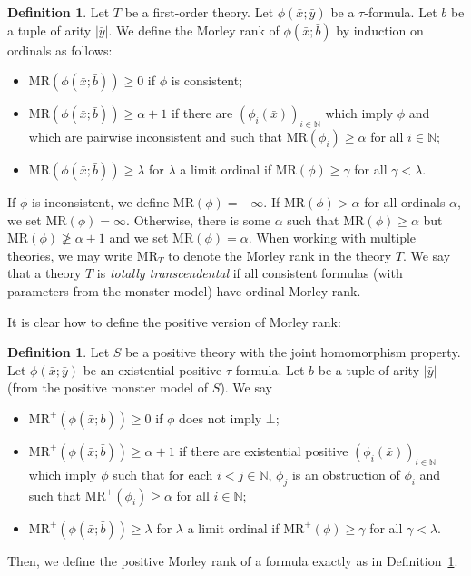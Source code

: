 \documentclass{amsart}
\theoremstyle{definition}
\newtheorem{definition}[theorem]{Definition}
\theoremstyle{remark}
\numberwithin{equation}{section}
\newcommand{\RM}{\mathrm{MR}}
\begin{document}
\begin{definition}\label{def:MR} Let $T$ be a first-order theory. Let $\phi(\bar{x};\bar{y})$ be a $\tau$-formula. Let $b$ be a tuple of arity $|\bar{y}|$. We define the Morley rank of $\phi(\bar{x};\bar{b})$ by induction on ordinals as follows: 
\begin{itemize}
    \item $\RM(\phi(\bar{x};\bar{b}))\geq 0$ if $\phi$ is consistent;
    \item $\RM(\phi(\bar{x};\bar{b}))\geq{\alpha}+1$ if there are $(\phi_i(\bar{x}))_{i\in\mathbb{N}}$ which imply $\phi$ and which are pairwise inconsistent and such that $\RM(\phi_i)\geq\alpha$ for all $i\in\mathbb{N}$;
    \item $\RM(\phi(\bar{x};\bar{b}))\geq \lambda$ for $\lambda$ a limit ordinal if $\RM(\phi)\geq\gamma$ for all $\gamma<\lambda$.
\end{itemize}
    If $\phi$ is inconsistent, we define $\RM(\phi)=-\infty$. If $\RM(\phi)>\alpha$ for all ordinals $\alpha$, we set $\RM(\phi)=\infty$. Otherwise, there is some $\alpha$ such that $\RM(\phi)\geq\alpha$ but $\RM(\phi)\not\geq\alpha+1$ and we set $\RM(\phi)=\alpha$.  When working with multiple theories, we may write $\RM_T$ to denote the Morley rank in the theory $T$. We say that a theory $T$ is \emph{totally transcendental} if all consistent formulas (with parameters from the monster model) have ordinal Morley rank. 
\end{definition}

It is clear how to define the positive version of Morley rank:
\begin{definition} Let $S$ be a positive theory with the joint homomorphism property. Let $\phi(\bar{x};\bar{y})$ be an existential positive $\tau$-formula. Let $b$ be a tuple of arity $|\bar{y}|$ (from the positive monster model of $S$). We say
\begin{itemize}
    \item $\RM^+(\phi(\bar{x};\bar{b}))\geq 0$ if $\phi$ does not imply $\bot$;
    \item $\RM^+(\phi(\bar{x};\bar{b}))\geq\alpha+1$ if there are existential positive $(\phi_i(\bar{x}))_{i\in\mathbb{N}}$ which imply $\phi$ such that for each $i<j\in\mathbb{N}$, $\phi_j$ is an obstruction of $\phi_i$ and such that $\RM^+(\phi_i)\geq\alpha$ for all $i\in\mathbb{N}$;
    \item $\RM^+(\phi(\bar{x};\bar{b}))\geq \lambda$ for $\lambda$ a limit ordinal if $\RM^+(\phi)\geq\gamma$ for all $\gamma<\lambda$.
\end{itemize}
    Then, we define the positive Morley rank of a formula exactly as in Definition~\ref{def:MR}. 
\end{definition}
\end{document}
